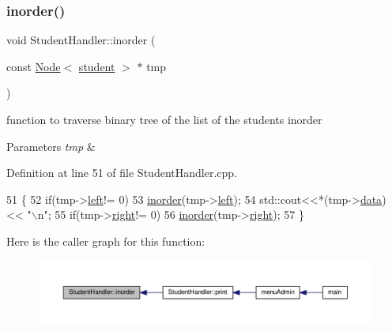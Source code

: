 \subsubsection{\texorpdfstring{inorder()}{inorder()}}
{\footnotesize\ttfamily void Student\+Handler\+::inorder (\begin{DoxyParamCaption}\item[{const \hyperlink{class_node}{Node}$<$ \hyperlink{classstudent}{student} $>$ $\ast$}]{tmp }\end{DoxyParamCaption})\hspace{0.3cm}{\ttfamily [private]}}

function to traverse binary tree of the list of the students inorder 
\begin{DoxyParams}{Parameters}
{\em tmp} & \\
\hline
\end{DoxyParams}


Definition at line 51 of file Student\+Handler.\+cpp.


\begin{DoxyCode}
51                                                      \{
52         \textcolor{keywordflow}{if}(tmp->\hyperlink{class_node_abb08a8b3137dd8fc8874348a439e01b4}{left}!= 0)
53             \hyperlink{class_student_handler_a9caee269c1ef9b34af2eeb0452a0cabb}{inorder}(tmp->\hyperlink{class_node_abb08a8b3137dd8fc8874348a439e01b4}{left});
54         std::cout<<*(tmp->\hyperlink{class_node_a8b322cc3cc17b752eb77533493713ddd}{data}) << \textcolor{stringliteral}{"\(\backslash\)n"};
55         \textcolor{keywordflow}{if}(tmp->\hyperlink{class_node_a34452c0684d3cb1590406ad201b43e65}{right}!= 0)
56             \hyperlink{class_student_handler_a9caee269c1ef9b34af2eeb0452a0cabb}{inorder}(tmp->\hyperlink{class_node_a34452c0684d3cb1590406ad201b43e65}{right});
57     \}
\end{DoxyCode}
Here is the caller graph for this function\+:
\nopagebreak
\begin{figure}[H]
\begin{center}
\leavevmode
\includegraphics[width=350pt]{class_student_handler_a9caee269c1ef9b34af2eeb0452a0cabb_icgraph}
\end{center}
\end{figure}
\mbox{\label{class_student_handler_a61f541e2aa02759a3213a9bceecf125c}} 
